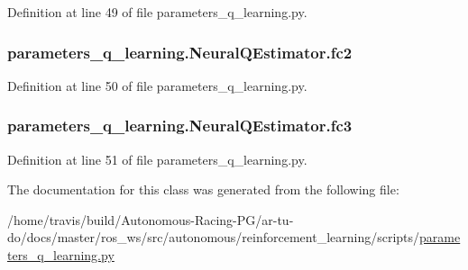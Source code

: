 Definition at line 49 of file parameters\+\_\+q\+\_\+learning.\+py.

\subsubsection[{\texorpdfstring{fc2}{fc2}}]{\setlength{\rightskip}{0pt plus 5cm}parameters\+\_\+q\+\_\+learning.\+Neural\+Q\+Estimator.\+fc2}\hypertarget{classparameters__q__learning_1_1_neural_q_estimator_a8aea853cf6307c617096ec84568101a6}{}\label{classparameters__q__learning_1_1_neural_q_estimator_a8aea853cf6307c617096ec84568101a6}


Definition at line 50 of file parameters\+\_\+q\+\_\+learning.\+py.

\subsubsection[{\texorpdfstring{fc3}{fc3}}]{\setlength{\rightskip}{0pt plus 5cm}parameters\+\_\+q\+\_\+learning.\+Neural\+Q\+Estimator.\+fc3}\hypertarget{classparameters__q__learning_1_1_neural_q_estimator_ad7204b9e83acb51e02e89dd40507daab}{}\label{classparameters__q__learning_1_1_neural_q_estimator_ad7204b9e83acb51e02e89dd40507daab}


Definition at line 51 of file parameters\+\_\+q\+\_\+learning.\+py.



The documentation for this class was generated from the following file\+:\begin{DoxyCompactItemize}
\item 
/home/travis/build/\+Autonomous-\/\+Racing-\/\+P\+G/ar-\/tu-\/do/docs/master/ros\+\_\+ws/src/autonomous/reinforcement\+\_\+learning/scripts/\hyperlink{parameters__q__learning_8py}{parameters\+\_\+q\+\_\+learning.\+py}\end{DoxyCompactItemize}
